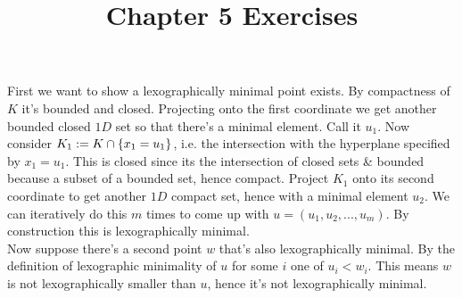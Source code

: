 \documentclass{article}
\title{Chapter 5 Exercises}
\newenvironment{ex}[1]
  {\renewcommand\theexercise{#1}\exercise}
  {\endexercise}
\begin{document}
\begin{ex}{5.1} %
  First we want to show a lexographically minimal point exists. By compactness of $K$ it's bounded and closed. Projecting onto the first coordinate we get another bounded closed $1D$ set so that there's a minimal element. Call it $u_1$. Now consider $K_1 := K \cap \{ x_1 = u_1 \}$, i.e. the intersection with the hyperplane specified by $x_1 = u_1$. This is closed since its the intersection of closed sets \& bounded because a subset of a bounded set, hence compact. Project $K_1$ onto its second coordinate to get another $1D$ compact set, hence with a minimal element $u_2$. We can iteratively do this $m$ times to come up with $u = (u_1, u_2, ..., u_m)$. By construction this is lexographically minimal. \, \\

  Now suppose there's a second point $w$ that's also lexographically minimal. By the definition of lexographic minimality of $u$ for some $i$ one of $u_i < w_i$. This means $w$ is not lexographically smaller than $u$, hence it's not lexographically minimal.
\end{ex} %
\end{document}
